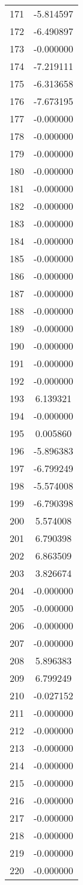 \documentclass[12pt]{article}
\begin{document}
\begin{longtable}{@{}cc@{}}
171 & -5.814597 \\
172 & -6.490897 \\
173 & -0.000000 \\
174 & -7.219111 \\
175 & -6.313658 \\
176 & -7.673195 \\
177 & -0.000000 \\
178 & -0.000000 \\
179 & -0.000000 \\
180 & -0.000000 \\
181 & -0.000000 \\
182 & -0.000000 \\
183 & -0.000000 \\
184 & -0.000000 \\
185 & -0.000000 \\
186 & -0.000000 \\
187 & -0.000000 \\
188 & -0.000000 \\
189 & -0.000000 \\
190 & -0.000000 \\
191 & -0.000000 \\
192 & -0.000000 \\
193 & 6.139321 \\
194 & -0.000000 \\
195 & 0.005860 \\
196 & -5.896383 \\
197 & -6.799249 \\
198 & -5.574008 \\
199 & -6.790398 \\
200 & 5.574008 \\
201 & 6.790398 \\
202 & 6.863509 \\
203 & 3.826674 \\
204 & -0.000000 \\
205 & -0.000000 \\
206 & -0.000000 \\
207 & -0.000000 \\
208 & 5.896383 \\
209 & 6.799249 \\
210 & -0.027152 \\
211 & -0.000000 \\
212 & -0.000000 \\
213 & -0.000000 \\
214 & -0.000000 \\
215 & -0.000000 \\
216 & -0.000000 \\
217 & -0.000000 \\
218 & -0.000000 \\
219 & -0.000000 \\
220 & -0.000000 \\

\end{longtable}
\end{document}
